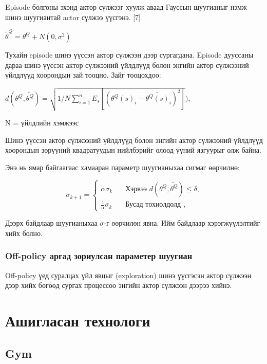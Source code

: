 \documentclass[12pt,A4]{report}
\begin{document}
Episode болгоны эхэнд актор сүлжээг хуулж аваад Гауссын шуугианыг нэмж шинэ шуугиантай actor сүлжээ үүсгэнэ. [7]

\begin{center}
$\tilde{\theta}^Q=\theta^Q+N(0, \sigma^2)$
\end{center}

Тухайн episode шинэ үүссэн актор сүлжээн дээр сургагдана. Episode дууссаны дараа шинэ үүссэн актор сүлжээний үйлдлүүд болон энгийн актор сүлжээний үйлдлүүд хоорондын зай тооцно. Зайг тооцохдоо:

\begin{center}

$d(\theta^Q, \tilde{\theta^Q})=\sqrt{1/N\sum_{i=1}^{n}E_s[(\theta^Q(s)_i-\tilde{\theta^Q(s)_i})^2]}),$

\end{center}

N = үйлдлийн хэмжээс

Шинэ үүссэн актор сүлжээний үйлдлүүд болон энгийн актор сүлжээний үйлдлүүд хоорондын зөрүүний квадратуудын нийлбэрийг олоод үүний язгуурыг олж байна.

Энэ нь ямар байгаагаас хамааран параметр шуугианыхаа сигмаг өөрчилнө:

\begin{center}
\[ \sigma_{k+1} =
  \begin{cases}
    \alpha\sigma_k       & \quad \text{Хэрвээ } d(\theta^Q, \tilde{\theta^Q})\leq\delta,\\
    \frac{1}{\alpha}\sigma_k  & \quad \text{Бусад тохиолдолд },
  \end{cases}
\]
\end{center}

Дээрх байдлаар шуугианыхаа $\sigma$-г өөрчилөн явна. Ийм байдлаар хэрэгжүүлэлтийг хийх болно.

\subsubsection{Off-policy аргад зориулсан параметер шуугиан}

Off-policy үед суралцах үйл явцыг (exploration) шинэ үүсгэсэн актор сүлжээн дээр хийх бөгөөд сургах процессоо энгийн актор сүлжээн дээрээ хийнэ.

\section{Ашигласан технологи}

\subsection{Gym}
\end{document}
